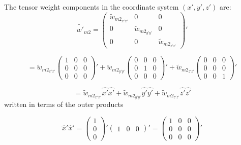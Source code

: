 \documentclass[double,12pt]{beavtex}
\begin{document}
\noindent The tensor weight components in the coordinate system $(x',y',z')$ are:
\begin{equation}\label{tensorcomp}{\widetilde{w'}_{m2}=\left(\begin{array}{ccc} \widetilde{w}_{{m2}_{x'x'}} & 0 & 0 \\ 0 & \widetilde{w}_{{m2}_{y'y'}} & 0 \\ 0 & 0 & \widetilde{w}_{{m2}_{z'z'}} \end{array}\right)'}\end{equation}

\begin{displaymath}{=\widetilde{w}_{{m2}_{x'x'}}\left(\begin{array}{ccc} 1 & 0 & 0 \\ 0 & 0 & 0 \\ 0 & 0 & 0 \end{array}\right)'+ \widetilde{w}_{{m2}_{y'y'}}\left(\begin{array}{ccc} 0 & 0 & 0 \\ 0 & 1 & 0 \\ 0 & 0 & 0 \end{array}\right)' + \widetilde{w}_{{m2}_{z'z'}}\left(\begin{array}{ccc} 0 & 0 & 0 \\ 0 & 0 & 0 \\ 0 & 0 & 1 \end{array}\right)'}\end{displaymath}

\begin{equation}{=\widetilde{w}_{{m2}_{x'x'}}\hat{x'}\hat{x'}+\widetilde{w}_{{m2}_{y'y'}}\hat{y'}\hat{y'}+\widetilde{w}_{{m2}_{z'z'}}\hat{z'}\hat{z'}}\end{equation}
written in terms of the outer products

\begin{displaymath}{\hat{x}'\hat{x}'= \left(\begin{array}{c} 1 \\ 0 \\ 0 \end{array}\right)'\left(\begin{array}{ccc} 1 & 0 & 0 \end{array}\right)'=\left(\begin{array}{ccc} 1 & 0 & 0 \\ 0 & 0 & 0 \\ 0 & 0 & 0 \end{array}\right)'}\end{displaymath}
\end{document}
